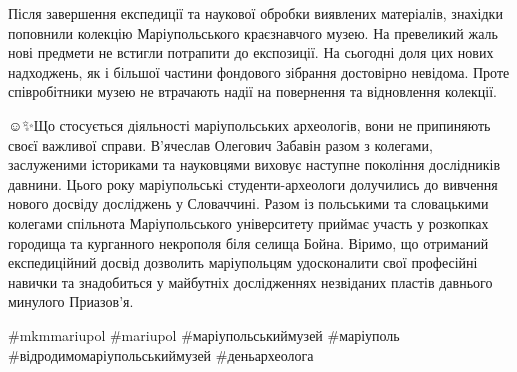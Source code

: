 Після завершення експедиції та наукової обробки виявлених матеріалів, знахідки
поповнили колекцію Маріупольського краєзнавчого музею. На превеликий жаль нові
предмети не встигли потрапити до експозиції. На сьогодні доля цих нових
надходжень, як і більшої частини фондового зібрання достовірно невідома. Проте
співробітники музею не втрачають надії на повернення та відновлення колекції.🙏

☺️✨️Що стосується діяльності маріупольських археологів, вони не припиняють своєї
важливої справи. В'ячеслав Олегович Забавін разом з колегами, заслуженими
істориками та науковцями виховує наступне покоління дослідників давнини. Цього
року маріупольські студенти-археологи долучились до вивчення нового досвіду
досліджень у Словаччині. Разом із польськими та словацькими колегами спільнота
Маріупольського університету приймає участь у розкопках городища та курганного
некрополя біля селища Бойна. Віримо, що отриманий експедиційний досвід
дозволить маріупольцям удосконалити свої професійні навички та знадобиться у
майбутніх дослідженнях незвіданих пластів давнього минулого Приазов'я.

\#mkmmariupol \#mariupol \#маріупольськиймузей \#маріуполь
\#відродимомаріупольськиймузей \#деньархеолога
